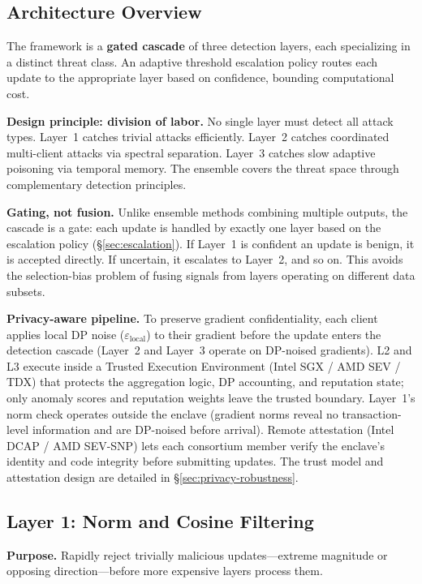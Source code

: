 \documentclass[10pt,journal]{IEEEtran}
\begin{document}
\subsection{Architecture Overview}

The framework is a \textbf{gated cascade} of three detection layers, each specializing in a distinct threat class. An adaptive threshold escalation policy routes each update to the appropriate layer based on confidence, bounding computational cost.

\textbf{Design principle: division of labor.} No single layer must detect all attack types. Layer~1 catches trivial attacks efficiently. Layer~2 catches coordinated multi-client attacks via spectral separation. Layer~3 catches slow adaptive poisoning via temporal memory. The ensemble covers the threat space through complementary detection principles.

\textbf{Gating, not fusion.} Unlike ensemble methods combining multiple outputs, the cascade is a gate: each update is handled by exactly one layer based on the escalation policy (\S\ref{sec:escalation}). If Layer~1 is confident an update is benign, it is accepted directly. If uncertain, it escalates to Layer~2, and so on. This avoids the selection-bias problem of fusing signals from layers operating on different data subsets.

\textbf{Privacy-aware pipeline.} To preserve gradient confidentiality, each client applies local DP noise ($\varepsilon_{\text{local}}$) to their gradient before the update enters the detection cascade (Layer~2 and Layer~3 operate on DP-noised gradients). L2 and L3 execute inside a Trusted Execution Environment (Intel SGX / AMD SEV / TDX) that protects the aggregation logic, DP accounting, and reputation state; only anomaly scores and reputation weights leave the trusted boundary. Layer~1's norm check operates outside the enclave (gradient norms reveal no transaction-level information and are DP-noised before arrival). Remote attestation (Intel DCAP / AMD SEV-SNP) lets each consortium member verify the enclave's identity and code integrity before submitting updates. The trust model and attestation design are detailed in \S\ref{sec:privacy-robustness}.

\subsection{Layer 1: Norm and Cosine Filtering}
\label{sec:l1}

\textbf{Purpose.} Rapidly reject trivially malicious updates---extreme magnitude or opposing direction---before more expensive layers process them.
\end{document}
